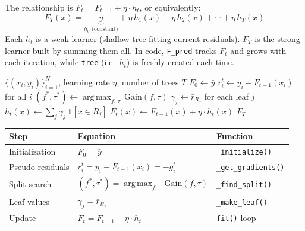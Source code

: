 \documentclass[11pt, a4paper]{article}
\begin{document}
The relationship is $F_t = F_{t-1} + \eta \cdot h_t$, or equivalently:
\[
F_T(x) = \underbrace{\bar{y}}_{h_0 \text{ (constant)}} + \eta\,h_1(x) + \eta\,h_2(x) + \cdots + \eta\,h_T(x)
\]
Each $h_t$ is a weak learner (shallow tree fitting current residuals).
$F_T$ is the strong learner built by summing them all.
In code, \texttt{F\_pred} tracks $F_t$ and grows with each iteration,
while \texttt{tree} (i.e.\ $h_t$) is freshly created each time.

\begin{algorithm}[H]
\caption{Vanilla GBM (MSE)}
\begin{algorithmic}[1]
\Require $\{(x_i,y_i)\}_{i=1}^N$, learning rate $\eta$, number of trees $T$
\State $F_0 \leftarrow \bar{y}$ \hfill{}
  \State $r_i^t \leftarrow y_i - F_{t-1}(x_i)$ for all $i$
    \hfill{}
  \State $(f^*, \tau^*) \leftarrow \operatorname{arg\,max}_{f,\,\tau}\,\mathrm{Gain}(f, \tau)$
    \hfill{}
  \State $\gamma_j \leftarrow \bar{r}_{R_j}$ for each leaf $j$
    \hfill{}
  \State $h_t(x) \leftarrow \sum_j \gamma_j\,\mathbf{1}[x\in R_j]$
  \State $F_t(x) \leftarrow F_{t-1}(x) + \eta\cdot h_t(x)$
    \hfill{}
\EndFor
\State \Return $F_T$
\end{algorithmic}
\end{algorithm}

\begin{center}
\begin{tabular}{lll}
\toprule
\textbf{Step} & \textbf{Equation} & \textbf{Function} \\
\midrule
Initialization   & $F_0 = \bar{y}$ & \texttt{\_initialize()} \\
Pseudo-residuals & $r_i^t = y_i - F_{t-1}(x_i) = -g_i^t$ & \texttt{\_get\_gradients()} \\
Split search     & $(f^*,\tau^*) = \operatorname{arg\,max}_{f,\tau}\,\mathrm{Gain}(f,\tau)$ & \texttt{\_find\_split()} \\
Leaf values      & $\gamma_j = \bar{r}_{R_j}$ & \texttt{\_make\_leaf()} \\
Update           & $F_t = F_{t-1} + \eta\cdot h_t$ & \texttt{fit()} loop \\
\bottomrule
\end{tabular}
\end{center}
\end{document}
